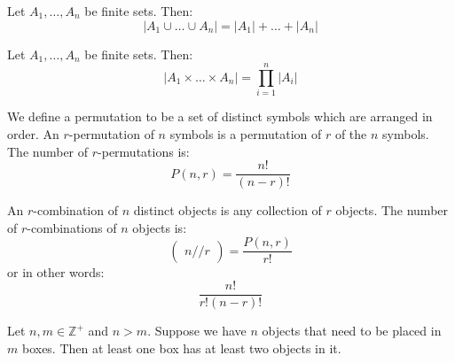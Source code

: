 \documentclass[nobib,notoc]{tufte-handout}
\begin{document}
\begin{defi}
\end{defi}
Let \(A_1,\ldots, A_n\) be finite sets. Then:
\begin{equation*}
	\lvert A_1\cup\ldots\cup A_n\rvert=\lvert A_1\rvert+\ldots+\lvert A_n\rvert
\end{equation*}
\begin{defi}
	Let \(A_1,\ldots,A_n\) be finite sets. Then:
	\begin{equation*}
		\lvert A_1\times\ldots\times A_n\rvert=\prod_{i=1}^n\lvert A_i\rvert
	\end{equation*}
\end{defi}
\begin{defi}[Permutation]
We define a permutation to be a set of distinct symbols which are arranged in order. An \(r\)-permutation of \(n\) symbols is a permutation of \(r\) of the \(n\) symbols. The number of \(r\)-permutations is:
\begin{equation*}
	P(n,r)=\frac{n!}{(n-r)!}
\end{equation*}
\end{defi}
\begin{defi}[Combination]
	An \(r\)-combination of \(n\) distinct objects is any collection of \(r\) objects. The number of \(r\)-combinations of \(n\) objects is:
	\begin{equation*}
		\begin{pmatrix}n//r\end{pmatrix}=\frac{P(n,r)}{r!}
	\end{equation*}
	or in other words:
	\begin{equation*}
		\frac{n!}{r!(n-r)!}
	\end{equation*}
\end{defi}
\begin{defi}
	Let \(n,m\in\mathbb{Z}^+\) and \(n>m\). Suppose we have \(n\) objects that need to be placed in \(m\) boxes. Then at least one box has at least two objects in it.
\end{defi}
\end{document}
